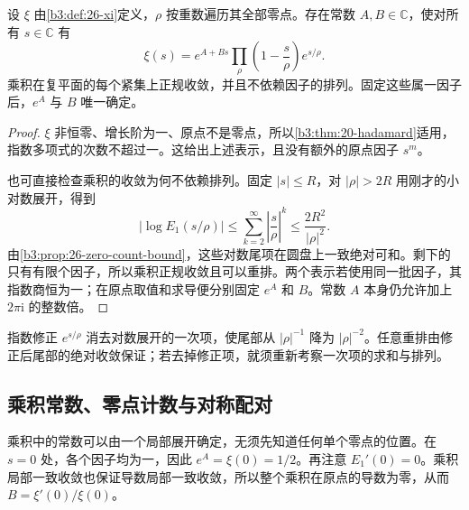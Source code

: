 \begin{theorem}\label{b3:thm:26-xi-product}
设 \(\xi\) 由\cref{b3:def:26-xi}定义，\(\rho\) 按重数遍历其全部零点。存在常数 \(A,B\in\mathbb C\)，使对所有 \(s\in\mathbb C\) 有
\begin{equation}\label{b3:eq:26-xi-product}
 \xi(s)=e^{A+Bs}\prod_\rho
                    \left(1-\frac s\rho\right)e^{s/\rho}.
\end{equation}
乘积在复平面的每个紧集上正规收敛，并且不依赖因子的排列。固定这些属一因子后，\(e^A\) 与 \(B\) 唯一确定。
\end{theorem}
\begin{proof}
\(\xi\) 非恒零、增长阶为一、原点不是零点，所以\cref{b3:thm:20-hadamard}适用，指数多项式的次数不超过一。这给出上述表示，且没有额外的原点因子 \(s^m\)。

也可直接检查乘积的收敛为何不依赖排列。固定 \(|s|\le R\)，对 \(|\rho|>2R\) 用刚才的小对数展开，得到
\[
 \left|\log E_1(s/\rho)\right|
 \le\sum_{k=2}^\infty\left|\frac s\rho\right|^k
 \le\frac{2R^2}{|\rho|^2}.
\]
由\cref{b3:prop:26-zero-count-bound}，这些对数尾项在圆盘上一致绝对可和。剩下的只有有限个因子，所以乘积正规收敛且可以重排。两个表示若使用同一批因子，其指数商恒为一；在原点取值和求导便分别固定 \(e^A\) 和 \(B\)。常数 \(A\) 本身仍允许加上 \(2\pi\mathrm i\) 的整数倍。
\end{proof}

指数修正 \(e^{s/\rho}\) 消去对数展开的一次项，使尾部从 \(|\rho|^{-1}\) 降为 \(|\rho|^{-2}\)。任意重排由修正后尾部的绝对收敛保证；若去掉修正项，就须重新考察一次项的求和与排列。

\subsection{乘积常数、零点计数与对称配对}
\label{b3:subsec:260604}

乘积中的常数可以由一个局部展开确定，无须先知道任何单个零点的位置。在 \(s=0\) 处，各个因子均为一，因此 \(e^A=\xi(0)=1/2\)。再注意 \(E_1'(0)=0\)。乘积局部一致收敛也保证导数局部一致收敛，所以整个乘积在原点的导数为零，从而 \(B=\xi'(0)/\xi(0)\)。

